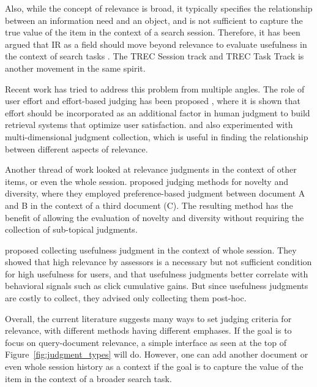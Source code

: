 Also, while the concept of relevance is broad, it typically specifies the relationship between an information need and an object, and is not sufficient to capture the true value of the item in the context of a search session. Therefore, it has been argued that IR as a field should move beyond relevance to evaluate usefulness in the context of search tasks \citep{Belkin:2015:SAL}. The TREC Session track \citep{carterette2014overview} and TREC Task Track \cite{yilmaz2015overview} is another movement in the same spirit.



Recent work has tried to address this problem from multiple angles. The role of user effort and effort-based judging has been proposed \citep{Yilmaz:2014,VermaYC16}, where it is shown that effort should be incorporated as an additional factor in human judgment to build retrieval systems that optimize user satisfaction. \cite{Golbus:2014:CDR} and \cite{Kim:2013} also experimented with multi-dimensional judgment collection, which is useful in finding the relationship between different aspects of relevance.

Another thread of work looked at relevance judgments in the context of other items, or even the whole session. \cite{Chandar2013} proposed judging methods for novelty and diversity, where they employed preference-based judgment between document A and B in the context of a third document (C). The resulting method has the benefit of allowing the evaluation of novelty and diversity without requiring the collection of sub-topical judgments. 

\cite{Mao:2016} proposed collecting usefulness judgment in the context of whole session. They showed that high relevance by assessors is a necessary but not sufficient condition for high usefulness for users, and that usefulness judgments better correlate with behavioral signals such as click cumulative gains. But since usefulness judgments are costly to collect, they advised only collecting them post-hoc.

Overall, the current literature suggests many ways to set judging criteria for relevance, with different methods having different emphases. If the goal is to focus on query-document relevance, a simple interface as seen at the top of Figure~\ref{fig:judgment_types} will do. However, one can add another document or even whole session history as a context if the goal is to capture the value of the item in the context of a broader search task. 

